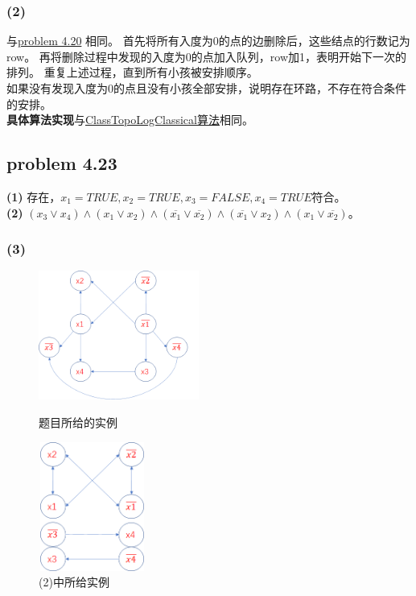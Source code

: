 \documentclass[11pt,a4paper,oneside,oldfontcommands]{ctexart}
\begin{document}
\subsubsection*{(2)}
与\hyperlink{problem 4.20}{problem 4.20} 相同。
首先将所有入度为0的点的边删除后，这些结点的行数记为row。
再将删除过程中发现的入度为0的点加入队列，row加1，表明开始下一次的排列。
重复上述过程，直到所有小孩被安排顺序。\\
\hspace*{20pt}如果没有发现入度为0的点且没有小孩全部安排，说明存在环路，不存在符合条件的安排。\\
\textbf{具体算法实现}与\hyperref[ClassTopoLogClassical]{ClassTopoLogClassical算法}相同。
{\subsection*{problem 4.23}}
\noindent\textbf{(1)}
存在，$x_1=TRUE,x_2=TRUE,x_3=FALSE,x_4=TRUE$符合。\\
\textbf{(2)}
$(x_3\vee x_4)\wedge(x_1\vee x_2)\wedge(\overline{x_1}\vee\overline{x_2})\wedge(\overline{x_1}\vee{x_2})\wedge({x_1}\vee\overline{x_2})$。
\subsubsection*{(3)}
\begin{figure}[h]
	\centering
	\begin{minipage}{150pt}
		\centering
		\includegraphics[width=150pt,height=120pt]{4-23-1.png}
		\caption{题目所给的实例}
	\end{minipage}
	\qquad
	\begin{minipage}{150pt}
		\centering
		\includegraphics[width=100pt,height=120pt]{4-23-2.png}
		\caption{{(2)}中所给实例}
	\end{minipage}
\end{figure}
\end{document}
